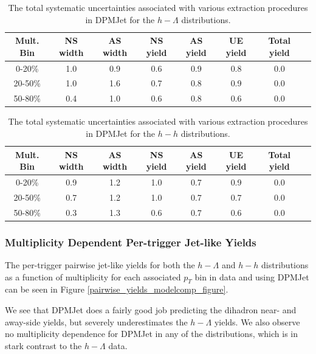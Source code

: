 \documentclass[ALICE,manyauthors]{ALICE_analysis_notes}
\begin{document}
\begin{table}[ht]
\centering
\begin{tabular}{|c||c|c|c|c|c|c|c|}
\hline
Mult. Bin & NS width & AS width & NS yield & AS yield & UE yield  & Total yield \\
\hline
0-20\% &  1.0 & 0.9 & 0.6 & 0.9 & 0.8 & 0.0 \\
20-50\% &  1.0 & 1.6 & 0.7 & 0.8 & 0.9 & 0.0 \\
50-80\% &  0.4 & 1.0 & 0.6 & 0.8 & 0.6 & 0.0 \\
\hline
\end{tabular}
\caption{The total systematic uncertainties associated with various extraction procedures in DPMJet for the $h-\Lambda$ distributions.}
\label{dpmjet_systematics_table_lambda}
\end{table}

\begin{table}[ht]
\centering
\begin{tabular}{|c||c|c|c|c|c|c|c|}
\hline
Mult. Bin & NS width & AS width & NS yield & AS yield & UE yield  & Total yield \\
\hline
0-20\% &  0.9 & 1.2 & 1.0 & 0.7 & 0.9 & 0.0 \\
20-50\% &  0.7 & 1.2 & 1.0 & 0.7 & 0.7 & 0.0 \\
50-80\% &  0.3 & 1.3 & 0.6 & 0.7 & 0.6 & 0.0 \\
\hline
\end{tabular}
\caption{The total systematic uncertainties associated with various extraction procedures in DPMJet for the $h-h$ distributions.}
\label{dpmjet_systematics_table_h}
\end{table}

\subsubsection{Multiplicity Dependent Per-trigger Jet-like Yields}
\label{pairwise_yields_modelcomp}
The per-trigger pairwise jet-like yields for both the $h-\Lambda$ and $h-h$ distributions  as a function of multiplicity for each associated $p_{T}$ bin in data and using DPMJet can be seen in Figure \ref{pairwise_yields_modelcomp_figure}.

We see that DPMJet does a fairly good job predicting the dihadron near- and away-side yields, but severely underestimates the $h-\Lambda$ yields. We also observe no multiplicity dependence for DPMJet in any of the distributions, which is in stark contrast to the $h-\Lambda$ data.
\end{document}
